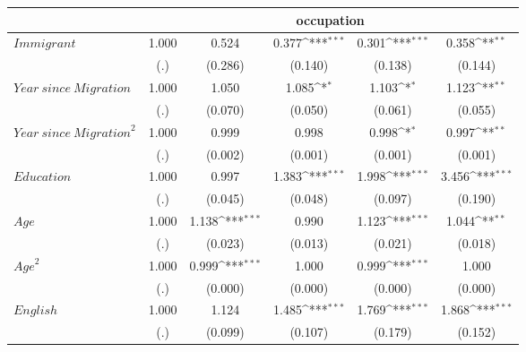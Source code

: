 {
\def\sym#1{\ifmmode^{#1}\else\(^{#1}\)\fi}
\begin{tabular}{l*{5}{c}}
\hline\hline
            &\multicolumn{5}{c}{occupation}                                                                               \\
\hline
$\mathit{Immigrant}$&       1.000         &       0.524         &       0.377\sym{***}&       0.301\sym{***}&       0.358\sym{**} \\
            &         (.)         &     (0.286)         &     (0.140)         &     (0.138)         &     (0.144)         \\
$\mathit{Year\ since\ Migration}$&       1.000         &       1.050         &       1.085\sym{*}  &       1.103\sym{*}  &       1.123\sym{**} \\
            &         (.)         &     (0.070)         &     (0.050)         &     (0.061)         &     (0.055)         \\
$\mathit{Year\ since\ Migration}^2$&       1.000         &       0.999         &       0.998         &       0.998\sym{*}  &       0.997\sym{**} \\
            &         (.)         &     (0.002)         &     (0.001)         &     (0.001)         &     (0.001)         \\
$\mathit{Education}$&       1.000         &       0.997         &       1.383\sym{***}&       1.998\sym{***}&       3.456\sym{***}\\
            &         (.)         &     (0.045)         &     (0.048)         &     (0.097)         &     (0.190)         \\
$\mathit{Age}$&       1.000         &       1.138\sym{***}&       0.990         &       1.123\sym{***}&       1.044\sym{**} \\
            &         (.)         &     (0.023)         &     (0.013)         &     (0.021)         &     (0.018)         \\
$\mathit{Age}^2$&       1.000         &       0.999\sym{***}&       1.000         &       0.999\sym{***}&       1.000         \\
            &         (.)         &     (0.000)         &     (0.000)         &     (0.000)         &     (0.000)         \\
$\mathit{English}$&       1.000         &       1.124         &       1.485\sym{***}&       1.769\sym{***}&       1.868\sym{***}\\
            &         (.)         &     (0.099)         &     (0.107)         &     (0.179)         &     (0.152)         \\

\end{tabular}}
